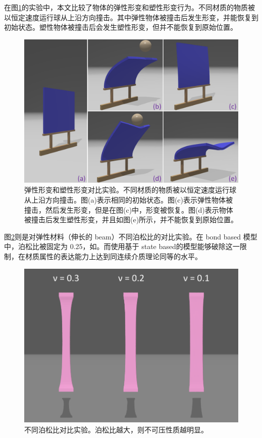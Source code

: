 在图\ref{demo_impact_upside}的实验中，本文比较了物体的弹性形变和塑性形变行为。不同材质的物质被以恒定速度运行球从上沿方向撞击。其中弹性物体被撞击后发生形变，并能恢复到初始状态。塑性物体被撞击后会发生塑性形变，但并不能恢复到原始位置。

\begin{figure}[!htb]
  \centering
  \captionsetup{justification=centering}
  \includegraphics[width=0.7\linewidth]{chap/image/demo_impact_upside}

  \caption{\label{demo_impact_upside}
           弹性形变和塑性形变对比实验。不同材质的物质被以恒定速度运行球从上沿方向撞击。图(a)表示相同的初始状态。图(c)表示弹性物体被撞击，然后发生形变，但是在图(c)中，形变被恢复。图(d)表示物体被撞击后发生塑性形变，并且如图(e)所示，并不能恢复到原始位置。
          }
\end{figure}

图\ref{compare_different_poisson_ratio}则是对弹性材料（伸长的 beam）不同泊松比的对比实验。在 bond based 模型中，泊松比被固定为 0.25，如。而使用基于 state based的模型能够破除这一限制，在材质属性的表达能力上达到同连续介质理论同等的水平。

\begin{figure}[!htb]
  \centering
  \captionsetup{justification=centering}
  \includegraphics[width=0.7\linewidth]{chap/image/compare_different_poisson_ratio}

  \caption{\label{compare_different_poisson_ratio}
           不同泊松比对比实验。泊松比越大，则不可压性质越明显。
          }
\end{figure}

